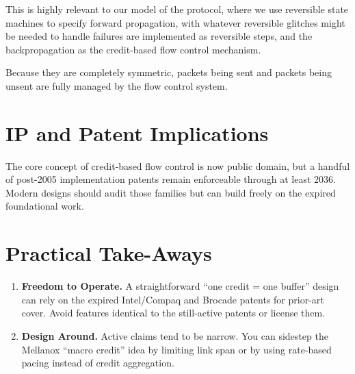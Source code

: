 \documentclass[../../../OAE-SPEC-MAIN.tex]{subfiles}
\begin{document}
 
This is highly relevant to our model of the protocol, where we use reversible state machines to specify forward propagation, with whatever reversible glitches might be needed to handle failures are implemented as reversible steps, and the backpropagation  as the credit-based flow control mechanism.

Because they are completely symmetric, packets being sent and packets being unsent are fully managed by the flow control system.








\section{IP and Patent Implications}

The core concept of credit-based flow control is now public domain, but a
handful of post-2005 implementation patents remain enforceable through
at least 2036.  Modern designs should audit those families but can build
freely on the expired foundational work.


\section{Practical Take-Aways}
\begin{enumerate}
\item \textbf{Freedom to Operate.}  A straightforward ``one credit = one
buffer'' design can rely on the expired Intel/Compaq and Brocade patents
for prior-art cover.  Avoid features identical to the still-active
patents or license them.
\item \textbf{Design Around.}  Active claims tend to be narrow.  You can
sidestep the Mellanox ``macro credit'' idea by limiting link span or by
using rate-based pacing instead of credit aggregation.
\end{enumerate}
\end{document}
